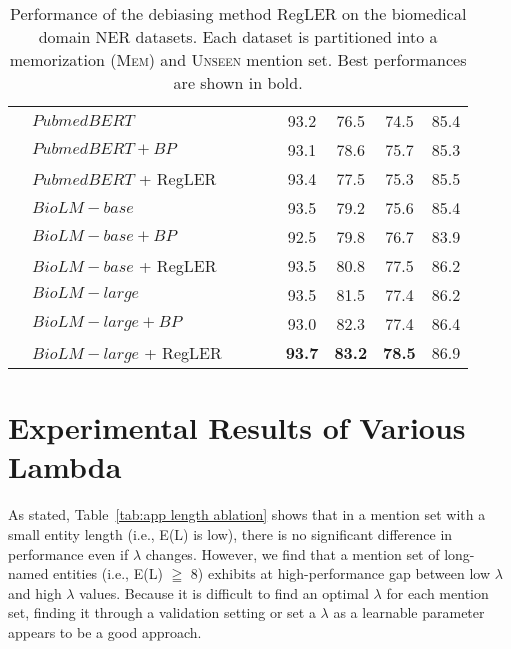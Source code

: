 \documentclass[11pt]{article}
\newcommand{\cmark}{\ding{51}}\newcommand{\xmark}{\ding{55}}\newcommand{\cross}{\ding{61}}\newcommand{\mb}[1]{\textcolor{red}{#1}}
\begin{document}
\begin{table*}[t]
\begin{adjustbox}{width=0.75\textwidth}
\begin{tabular}{ l l c c c c c c c }
\cmidrule{2-9}
& $PubmedBERT$ & \xmark & \xmark & \xmark & 93.2 & 76.5 & 74.5 & 85.4 \\
& $PubmedBERT + {BP}$ & \xmark & \xmark & \xmark & 93.1 & 78.6 & 75.7 & 85.3 \\
& $PubmedBERT$ + RegLER & \cmark & \cmark & \cmark & 93.4 & 77.5 & 75.3 & 85.5 \\
\cmidrule{2-9}
& $BioLM-base$ & \xmark & \xmark & \xmark & 93.5 & 79.2 & 75.6 & 85.4 \\
& $BioLM-base + {BP}$ & \xmark & \xmark & \xmark & 92.5 & 79.8 & 76.7 & 83.9 \\
& $BioLM-base$ + RegLER & \cmark & \cmark & \cmark & 93.5 & 80.8 & 77.5 & 86.2 \\
\cmidrule{2-9}
& $BioLM-large$ & \xmark & \xmark & \xmark & 93.5 & 81.5 & 77.4 & 86.2 \\
& $BioLM-large + {BP}$ & \xmark & \xmark & \xmark & 93.0 & 82.3 & 77.4 & 86.4 \\
& $BioLM-large$ + RegLER & \cmark & \cmark & \cmark & \textbf{93.7} & \textbf{83.2} & \textbf{78.5} & 86.9 \\
\bottomrule
\end{tabular}
\end{adjustbox}
\caption{Performance of the debiasing method RegLER on the biomedical domain NER datasets. Each dataset is partitioned into a memorization (\textsc{Mem}) and \textsc{Unseen} mention set. Best performances are shown in bold.}
\label{tab:maintable 4}
\end{table*}


\section{Experimental Results of Various Lambda}
\label{app:lambda results}

As stated, Table~\ref{tab:app length ablation} shows that in a mention set with a small entity length (i.e., E(L) is low), there is no significant difference in performance even if $\lambda$ changes.
However, we find that a mention set of long-named entities (i.e., E(L) $\geqq$ 8) exhibits at high-performance gap between low $\lambda$ and high $\lambda$ values.
Because it is difficult to find an optimal $\lambda$ for each mention set, finding it through a validation setting or set a $\lambda$ as a learnable parameter appears to be a good approach.
\end{document}
